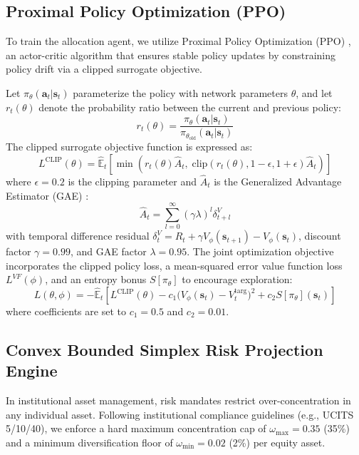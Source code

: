 \documentclass[conference]{IEEEtran}
\begin{document}
\subsection{Proximal Policy Optimization (PPO)}
To train the allocation agent, we utilize Proximal Policy Optimization (PPO) \cite{schulman2017proximal}, an actor-critic algorithm that ensures stable policy updates by constraining policy drift via a clipped surrogate objective. 

Let $\pi_\theta(\mathbf{a}_t|\mathbf{s}_t)$ parameterize the policy with network parameters $\theta$, and let $r_t(\theta)$ denote the probability ratio between the current and previous policy:
\begin{equation}
    r_t(\theta) = \frac{\pi_\theta(\mathbf{a}_t | \mathbf{s}_t)}{\pi_{\theta_{\text{old}}}(\mathbf{a}_t | \mathbf{s}_t)}
\end{equation}
The clipped surrogate objective function is expressed as:
\begin{equation}
    L^{\text{CLIP}}(\theta) = \hat{\mathbb{E}}_t \left[ \min\left( r_t(\theta)\hat{A}_t, \; \text{clip}(r_t(\theta), 1-\epsilon, 1+\epsilon)\hat{A}_t \right) \right]
\end{equation}
where $\epsilon = 0.2$ is the clipping parameter and $\hat{A}_t$ is the Generalized Advantage Estimator (GAE) \cite{schulman2015high}:
\begin{equation}
    \hat{A}_t = \sum_{l=0}^{\infty} (\gamma \lambda)^l \delta_{t+l}^V
\end{equation}
with temporal difference residual $\delta_t^V = R_t + \gamma V_\phi(\mathbf{s}_{t+1}) - V_\phi(\mathbf{s}_t)$, discount factor $\gamma = 0.99$, and GAE factor $\lambda = 0.95$. The joint optimization objective incorporates the clipped policy loss, a mean-squared error value function loss $L^{VF}(\phi)$, and an entropy bonus $S[\pi_\theta]$ to encourage exploration:
\begin{equation}
    L(\theta, \phi) = -\hat{\mathbb{E}}_t \left[ L^{\text{CLIP}}(\theta) - c_1 \big( V_\phi(\mathbf{s}_t) - V_t^{\text{targ}} \big)^2 + c_2 S[\pi_\theta](\mathbf{s}_t) \right]
\end{equation}
where coefficients are set to $c_1 = 0.5$ and $c_2 = 0.01$.

\subsection{Convex Bounded Simplex Risk Projection Engine}
In institutional asset management, risk mandates restrict over-concentration in any individual asset. Following institutional compliance guidelines (e.g., UCITS 5/10/40), we enforce a hard maximum concentration cap of $\omega_{\max} = 0.35$ (35\%) and a minimum diversification floor of $\omega_{\min} = 0.02$ (2\%) per equity asset.
\end{document}
